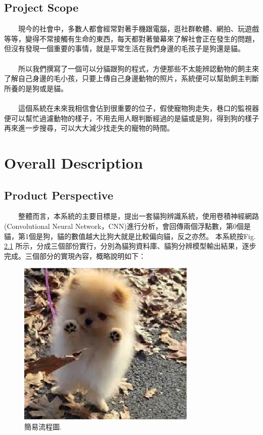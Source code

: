 \documentclass{scrreprt}
\begin{document}
\begin{CJK*}{UTF8}{bsmi}
\section{Project Scope}
　　現今的社會中，多數人都會經常對著手機跟電腦，逛社群軟體、網拍、玩遊戲等等，變得不常接觸有生命的東西，每天都對著螢幕來了解社會正在發生的問題，但沒有發現一個重要的事情，就是平常生活在我們身邊的毛孩子是狗還是貓。\\
	\\
　　所以我們撰寫了一個可以分貓跟狗的程式，方便那些不太能辨認動物的飼主來了解自己身邊的毛小孩，只要上傳自己身邊動物的照片，系統便可以幫助飼主判斷所養的是狗或是貓。\\
	\\
　　這個系統在未來我相信會佔到很重要的位子，假使寵物狗走失，巷口的監視器便可以幫忙過濾動物的樣子，不用去用人眼判斷經過的是貓或是狗，得到狗的樣子再來進一步搜尋，可以大大減少找走失的寵物的時間。\\



\chapter{Overall Description}

\section{Product Perspective}
　　整體而言，本系統的主要目標是，提出一套貓狗辨識系統，使用卷積神經網路(Convolutional Neural Network，CNN)進行分析，會回傳兩個浮點數，第0個是貓，第1個是狗，貓的數值越大比狗大就是比較偏向貓，反之亦然。
本系統按Fig.\,\ref{fig:2.1} 所示，分成三個部份實行，分別為貓狗資料庫、貓狗分辨模型輸出結果，逐步完成。三個部分的實現內容，概略說明如下：\\
\begin{figure}[h]
\begin{center}
\includegraphics[width=8.5cm]{dog.jpg} 
\end{center} 
\label{fig:2.1} 
\caption{簡易流程圖.} 
\end{figure}


\end{CJK*}
\end{document}
